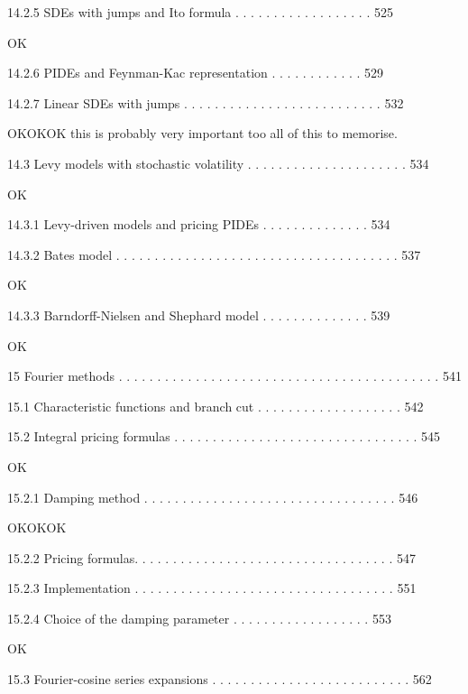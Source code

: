 14.2.5 SDEs with jumps and Ito formula . . . . . . . . . . . . . . . . . . 525

OK

14.2.6 PIDEs and Feynman-Kac representation . . . . . . . . . . . . 529



14.2.7 Linear SDEs with jumps . . . . . . . . . . . . . . . . . . . . . . . . . . 532

OKOKOK this is probably very important too all of this to memorise.

14.3 Levy models with stochastic volatility . . . . . . . . . . . . . . . . . . . . . 534

OK

14.3.1 Levy-driven models and pricing PIDEs . . . . . . . . . . . . . . 534



14.3.2 Bates model . . . . . . . . . . . . . . . . . . . . . . . . . . . . . . . . . . . . . 537

OK

14.3.3 Barndorff-Nielsen and Shephard model . . . . . . . . . . . . . . 539

OK

15 Fourier methods . . . . . . . . . . . . . . . . . . . . . . . . . . . . . . . . . . . . . . . . . . 541



15.1 Characteristic functions and branch cut . . . . . . . . . . . . . . . . . . . 542



15.2 Integral pricing formulas . . . . . . . . . . . . . . . . . . . . . . . . . . . . . . . . 545

OK

15.2.1 Damping method . . . . . . . . . . . . . . . . . . . . . . . . . . . . . . . . . 546

OKOKOK

15.2.2 Pricing formulas. . . . . . . . . . . . . . . . . . . . . . . . . . . . . . . . . . 547



15.2.3 Implementation . . . . . . . . . . . . . . . . . . . . . . . . . . . . . . . . . . 551



15.2.4 Choice of the damping parameter . . . . . . . . . . . . . . . . . . 553

OK

15.3 Fourier-cosine series expansions . . . . . . . . . . . . . . . . . . . . . . . . . . 562

